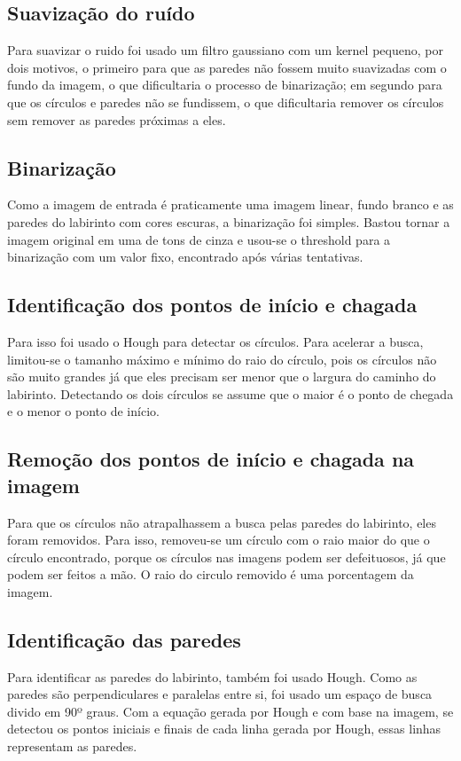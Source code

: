 \documentclass[conference]{IEEEtran}
\begin{document}
\subsection{Suavização do ruído}
 Para suavizar o ruido foi usado um filtro gaussiano com um kernel pequeno, por dois motivos, o primeiro para que as paredes não fossem muito suavizadas com o fundo da imagem, o que dificultaria o processo de binarização; em segundo para que os círculos e paredes não se fundissem, o que dificultaria remover os círculos sem remover as paredes próximas a eles.
 \subsection{Binarização}
 Como a imagem de entrada é praticamente uma imagem linear, fundo branco e as paredes do labirinto com cores escuras, a binarização foi simples. Bastou tornar a imagem original em uma de tons de cinza e usou-se o threshold para a binarização com um valor fixo, encontrado após várias tentativas.

\subsection{Identificação dos pontos de início e chagada}
Para isso foi usado o Hough para detectar os círculos. Para acelerar a busca, limitou-se o tamanho máximo e mínimo do raio do círculo, pois os círculos não são muito grandes já que eles precisam ser menor que o largura do caminho do labirinto. Detectando os dois círculos se assume que o maior é o ponto de chegada e o menor o ponto de início.

\subsection{Remoção dos pontos de início e chagada na imagem}
Para que os círculos não atrapalhassem a busca pelas paredes do labirinto, eles foram removidos. Para isso, removeu-se um círculo com o raio maior do que o círculo encontrado, porque os círculos nas imagens podem ser defeituosos, já que podem ser feitos a mão. O raio do circulo removido é uma porcentagem da imagem.
\subsection{Identificação das paredes}
Para identificar as paredes do labirinto, também foi usado Hough. Como as paredes são perpendiculares e paralelas entre si, foi usado um espaço de busca divido em 90º graus. Com a equação gerada por Hough e com base na imagem, se detectou os pontos iniciais e finais de cada linha gerada por Hough, essas linhas representam as paredes.
\end{document}
